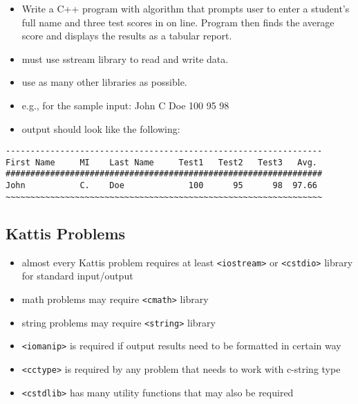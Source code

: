 \documentclass[11pt]{article}
\providecommand{\tightlist}{%
      \setlength{\itemsep}{0pt}\setlength{\parskip}{0pt}}
\begin{document}
\begin{enumerate}
  \begin{itemize}
  \tightlist
  \item
    Write a C++ program with algorithm that prompts user to enter a
    student's full name and three test scores in on line. Program then
    finds the average score and displays the results as a tabular
    report.
  \item
    must use sstream library to read and write data.
  \item
    use as many other libraries as possible.
  \item
    e.g., for the sample input: John C Doe 100 95 98
  \item
    output should look like the following:
  \end{itemize}
\end{enumerate}

\begin{verbatim}
----------------------------------------------------------------
First Name     MI    Last Name     Test1   Test2   Test3   Avg.
################################################################
John           C.    Doe             100      95      98  97.66
~~~~~~~~~~~~~~~~~~~~~~~~~~~~~~~~~~~~~~~~~~~~~~~~~~~~~~~~~~~~~~~~
\end{verbatim}

    \hypertarget{kattis-problems}{%
\subsection{Kattis Problems}\label{kattis-problems}}

\begin{itemize}
\tightlist
\item
  almost every Kattis problem requires at least
  \texttt{\textless{}iostream\textgreater{}} or
  \texttt{\textless{}cstdio\textgreater{}} library for standard
  input/output
\item
  math problems may require \texttt{\textless{}cmath\textgreater{}}
  library
\item
  string problems may require \texttt{\textless{}string\textgreater{}}
  library
\item
  \texttt{\textless{}iomanip\textgreater{}} is required if output
  results need to be formatted in certain way
\item
  \texttt{\textless{}cctype\textgreater{}} is required by any problem
  that needs to work with c-string type
\item
  \texttt{\textless{}cstdlib\textgreater{}} has many utility functions
  that may also be required
\end{itemize}
\end{document}
